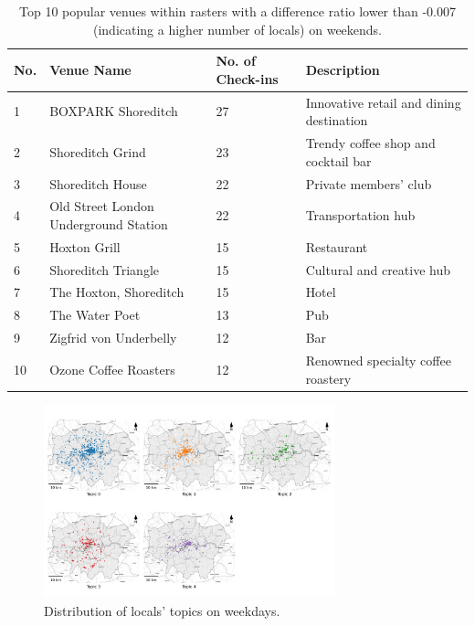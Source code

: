 \documentclass{article}
\theoremstyle{remark}
\begin{document}
\begin{table}[!h]
\centering
\caption{\label{tab:popular_venues_localspop_weekend}Top 10 popular venues within rasters with a difference ratio lower than -0.007 (indicating a higher number of locals) on weekends.}
\begin{adjustbox}{max width=\textwidth, margin=0cm}
\begin{threeparttable}
\begin{tabular}{lp{5cm}lp{4cm}} \hline
No. & Venue Name & No. of Check-ins & Description \\ \hline
1 & BOXPARK Shoreditch & 27 & Innovative retail and dining destination \\
2 & Shoreditch Grind & 23 & Trendy coffee shop and cocktail bar \\
3 & Shoreditch House & 22 & Private members' club \\
4 & Old Street London Underground Station & 22 & Transportation hub \\
5 & Hoxton Grill & 15 & Restaurant \\
6 & Shoreditch Triangle & 15 & Cultural and creative hub \\
7 & The Hoxton, Shoreditch & 15 & Hotel \\
8 & The Water Poet & 13 & Pub \\
9 & Zigfrid von Underbelly & 12 & Bar \\
10 & Ozone Coffee Roasters & 12 & Renowned specialty coffee roastery \\ \hline
\end{tabular}
\end{threeparttable}
\end{adjustbox}
\end{table}


\begin{figure}[!h]
\centering
\includegraphics[width=0.75\textwidth]{figures/topics_distribution_weekday_locals.png}
\caption{\label{fig:topics_distribution_weekday_locals}Distribution of locals' topics on weekdays.}
\end{figure}
\end{document}
